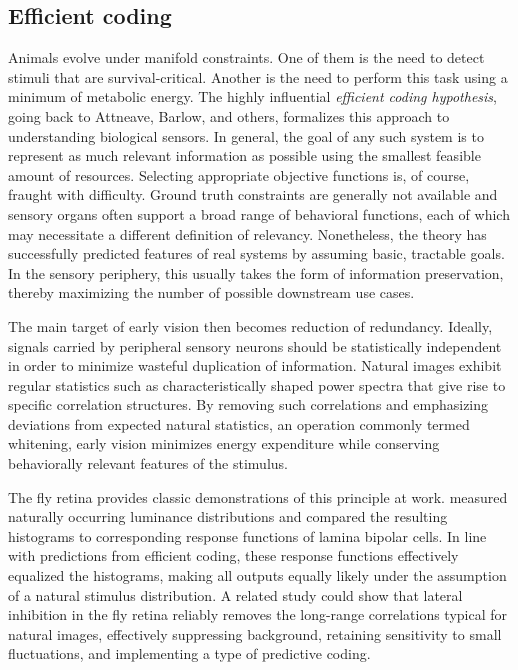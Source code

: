 \subsection{Efficient coding} Animals evolve under manifold constraints. One of them is the need to detect stimuli that are survival-critical. Another is the need to perform this task using a minimum of metabolic energy. The highly influential \textit{efficient coding hypothesis}, going back to Attneave, Barlow, and others, formalizes this approach to understanding biological sensors. In general, the goal of any such system is to represent as much relevant information as possible using the smallest feasible amount of resources. Selecting appropriate objective functions is, of course, fraught with difficulty. Ground truth constraints are generally not available and sensory organs often support a broad range of behavioral functions, each of which may necessitate a different definition of relevancy. Nonetheless, the theory has successfully predicted features of real systems by assuming basic, tractable goals. In the sensory periphery, this usually takes the form of information preservation, thereby maximizing the number of possible downstream use cases.

The main target of early vision then becomes reduction of redundancy. Ideally, signals carried by peripheral sensory neurons should be statistically independent in order to minimize wasteful duplication of information. Natural images exhibit regular statistics such as characteristically shaped power spectra that give rise to specific correlation structures. By removing such correlations and emphasizing deviations from expected natural statistics, an operation commonly termed whitening, early vision minimizes energy expenditure while conserving behaviorally relevant features of the stimulus.

The fly retina provides classic demonstrations of this principle at work. \citet{Laughlin:1981wn} measured naturally occurring luminance distributions and compared the resulting histograms to corresponding response functions of lamina bipolar cells. In line with predictions from efficient coding, these response functions effectively equalized the histograms, making all outputs equally likely under the assumption of a natural stimulus distribution. A related study \citep{Srinivasan:1982uq} could show that lateral inhibition in the fly retina reliably removes the long-range correlations typical for natural images, effectively suppressing background, retaining sensitivity to small fluctuations, and implementing a type of predictive coding.


